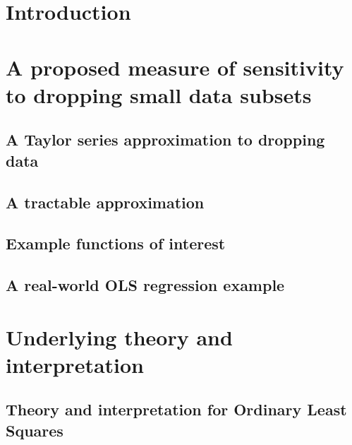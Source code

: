 \documentclass[webpdf,contemporary,small,namedate]{oup-authoring-template}%
\theoremstyle{thmstyleone}%
\begin{document}
\maketitle
{}

\section{Introduction}


\section{A proposed measure of sensitivity to dropping small data subsets}
    

    \subsection{A Taylor series approximation to dropping data}
    

    \subsection{A tractable approximation}
    

    \subsection{Example functions of interest}
    

    \subsection{A real-world OLS regression example}
    

\section{Underlying theory and interpretation} 
    

    \subsection{Theory and interpretation for Ordinary Least Squares}
    
\end{document}
